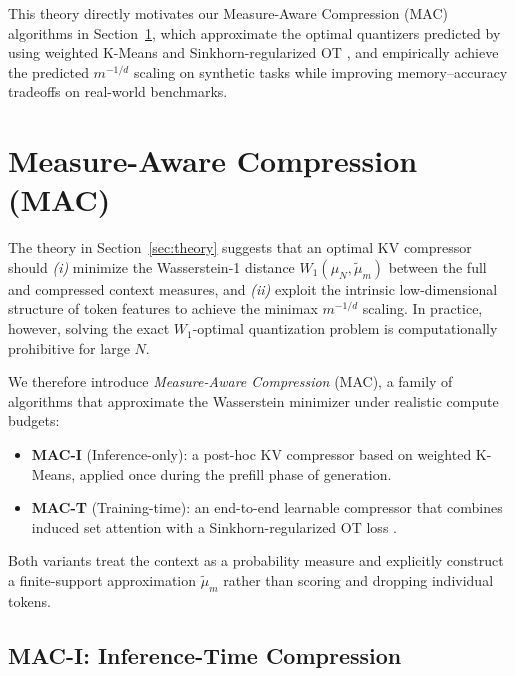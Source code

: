 \documentclass{article}
\theoremstyle{plain}
\theoremstyle{definition}
\theoremstyle{remark}
\newcommand{\muN}{\mu_N} %
\newcommand{\Wass}[1]{W_{#1}} %
\begin{document}
This theory directly motivates our Measure-Aware Compression (MAC) algorithms in Section~\ref{sec:method},  
which approximate the optimal quantizers predicted by \citet{graf2000foundations} using weighted K-Means and Sinkhorn-regularized OT \citep{cuturi2013sinkhorn},  
and empirically achieve the predicted $m^{-1/d}$ scaling on synthetic tasks while improving memory--accuracy tradeoffs on real-world benchmarks.

\section{Measure-Aware Compression (MAC)}
\label{sec:method}

The theory in Section~\ref{sec:theory} suggests that an optimal KV compressor should
\emph{(i)} minimize the Wasserstein-1 distance $\Wass{1}(\muN,\tilde\mu_m)$ between the
full and compressed context measures, and \emph{(ii)} exploit the intrinsic low-dimensional
structure of token features to achieve the minimax $m^{-1/d}$ scaling. In practice, however,
solving the exact $W_1$-optimal quantization problem is computationally prohibitive for
large $N$.

We therefore introduce \emph{Measure-Aware Compression} (MAC), a family of algorithms that
approximate the Wasserstein minimizer under realistic compute budgets:

\begin{itemize}[leftmargin=*,noitemsep,topsep=2pt]
    \item \textbf{MAC-I} (Inference-only): a post-hoc KV compressor based on weighted
    K-Means, applied once during the prefill phase of generation.
    \item \textbf{MAC-T} (Training-time): an end-to-end learnable compressor that combines
    induced set attention \citep{lee2019set} with a Sinkhorn-regularized OT loss
    \citep{cuturi2013sinkhorn}.
\end{itemize}

Both variants treat the context as a probability measure and explicitly construct a
finite-support approximation $\tilde\mu_m$ rather than scoring and dropping individual
tokens.

\subsection{MAC-I: Inference-Time Compression}
\label{sec:method_inference}
\end{document}
